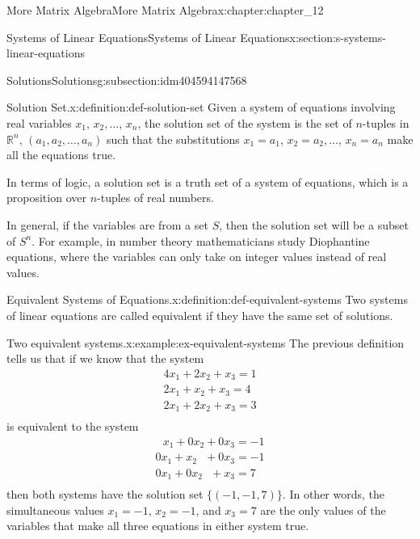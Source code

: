 \documentclass[twoside,10pt,]{book}
\numberwithin{equation}{section}
\begin{document}
\begin{chapterptx}{More Matrix Algebra}{}{More Matrix Algebra}{}{}{x:chapter:chapter_12}
\begin{sectionptx}{Systems of Linear Equations}{}{Systems of Linear Equations}{}{}{x:section:s-systems-linear-equations}
\begin{subsectionptx}{Solutions}{}{Solutions}{}{}{g:subsection:idm404594147568}
\begin{definition}{Solution Set.}{x:definition:def-solution-set}%
%
Given a system of equations involving real variables \(x_1\), \(x_2, \ldots \), \(x_n\), the solution set of the system is the set of \(n\)-tuples in \(\mathbb{R}^n\), \(\left(a_1, a_2, \ldots ,a_n\right)\) such that the substitutions \(x_1= a_1\), \(x_2=
a_2, \ldots\), \(x_n= a_n\) make all the equations true.%
\end{definition}
In terms of logic, a solution set is a truth set of a system of equations, which is a proposition over \(n\)-tuples of real numbers.%
\par
In general, if the variables are from a set \(S\), then the solution set will be a subset of \(S^n\). For example, in number theory mathematicians study Diophantine equations, where the variables can only take on integer values instead of real values.%
\begin{definition}{Equivalent Systems of Equations.}{x:definition:def-equivalent-systems}%
Two systems of linear equations are called equivalent if they have the same set of solutions.%
\end{definition}
\begin{example}{Two equivalent systems.}{x:example:ex-equivalent-systems}%
The previous definition tells us that if we know that the system%
\begin{equation*}
\begin{array}{l}
4 x_1+2 x_2+x_3=1 \\
2 x_1+x_2+x_3=4 \\
2 x_1+2 x_2+x_3=3 \\
\end{array}
\end{equation*}
is equivalent to the system%
\begin{equation*}
\begin{array}{l}
\text{   }x_1+0 x_2+0x_3=-1 \\
0 x_1+x_2\text{   }+0x_3=-1 \\
0 x_1+0 x_2\text{   }+x_3= 7 \\
\end{array}
\end{equation*}
then both systems have the solution set \(\{(-1, -1, 7)\}\). In other words, the simultaneous values \(x_1=-1\), \(x_2= -1\), and \(x_3= 7\) are the only values of the variables that make all three equations in either system true.%
\end{example}
\end{subsectionptx}

\end{sectionptx}
\end{chapterptx}
\end{document}
